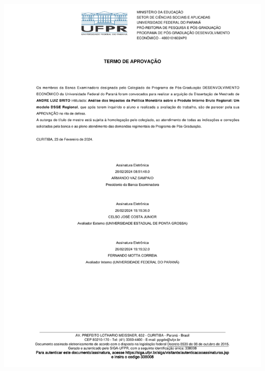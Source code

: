 \documentclass[../thesis.tex]{subfiles}
\begin{document}
	
\newpage

{\noindent
	
	{\centering
		
		\includegraphics[scale=0.85]{../docs/termo_de_aprovacao.pdf}
		
	}
	
}
		
	\thispagestyle{empty}	


\newpage
\end{document}
